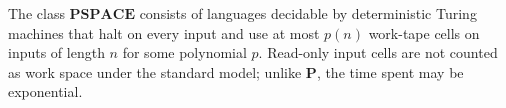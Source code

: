 
The class $\mathbf{PSPACE}$ consists of languages decidable by deterministic Turing machines that halt on every input and use at most $p(n)$ work-tape cells on inputs of length $n$ for some polynomial $p$. Read-only input cells are not counted as work space under the standard model; unlike $\mathbf P$, the time spent may be exponential.
